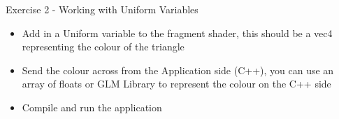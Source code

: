 \begin{frame}{Exercise 2 - Working with Uniform Variables}
	\begin{itemize}
		\item Add in a Uniform variable to the fragment shader, this should be a vec4 representing the colour of the triangle
		\item Send the colour across from the Application side (C++), you can use an array of floats or GLM Library to represent the colour on the C++ side
		\item Compile and run the application
	\end{itemize}
\end{frame}


